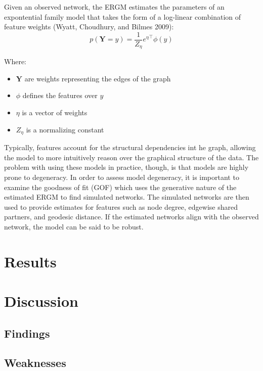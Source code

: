 \documentclass[
]{article}
\providecommand{\tightlist}{%
  \setlength{\itemsep}{0pt}\setlength{\parskip}{0pt}}
\begin{document}
Given an observed network, the ERGM estimates the parameters of an expontential family model that takes the form of a log-linear combination of feature weights (Wyatt, Choudhury, and Bilmes 2009): \[
p(\mathbf{Y}=y)=\frac{1}{Z_\eta}{e^\eta}^\top\phi(y)
\]

Where:

\begin{itemize}
\tightlist
\item
  \(\mathbf{Y}\) are weights representing the edges of the graph
\item
  \(\phi\) defines the features over \(y\)
\item
  \(\eta\) is a vector of weights
\item
  \(Z_\eta\) is a normalizing constant
\end{itemize}

Typically, features account for the structural dependencies int he graph, allowing the model to more intuitively reason over the graphical structure of the data. The problem with using these models in practice, though, is that models are highly prone to degeneracy. In order to assess model degeneracy, it is important to examine the goodness of fit (GOF) which uses the generative nature of the estimated ERGM to find simulated networks. The simulated networks are then used to provide estimates for features such as node degree, edgewise shared partners, and geodesic distance. If the estimated networks align with the observed network, the model can be said to be robust.

\hypertarget{results}{%
\section{Results}\label{results}}

\hypertarget{discussion}{%
\section{Discussion}\label{discussion}}

\hypertarget{findings}{%
\subsection{Findings}\label{findings}}

\hypertarget{weaknesses}{%
\subsection{Weaknesses}\label{weaknesses}}
\end{document}
